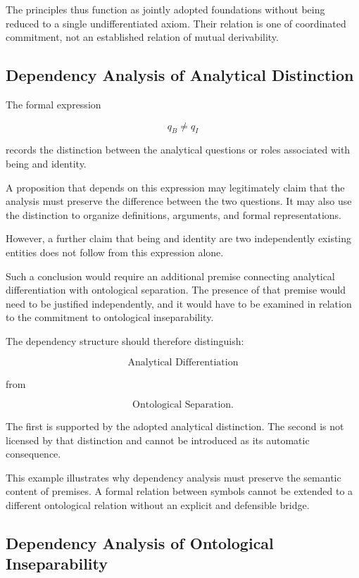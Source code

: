 The principles thus function as jointly adopted foundations
without being reduced to a single undifferentiated axiom.
Their relation is one of coordinated commitment, not an
established relation of mutual derivability.

\subsection{Dependency Analysis of Analytical Distinction}

The formal expression

\[
    q_B \neq q_I
\]

records the distinction between the analytical questions or
roles associated with being and identity.

A proposition that depends on this expression may legitimately
claim that the analysis must preserve the difference between
the two questions. It may also use the distinction to organize
definitions, arguments, and formal representations.

However, a further claim that being and identity are two
independently existing entities does not follow from this
expression alone.

Such a conclusion would require an additional premise connecting
analytical differentiation with ontological separation. The
presence of that premise would need to be justified independently,
and it would have to be examined in relation to the commitment
to ontological inseparability.

The dependency structure should therefore distinguish:

\[
    \text{Analytical Differentiation}
\]

from

\[
    \text{Ontological Separation}.
\]

The first is supported by the adopted analytical distinction.
The second is not licensed by that distinction and cannot be
introduced as its automatic consequence.

This example illustrates why dependency analysis must preserve
the semantic content of premises. A formal relation between
symbols cannot be extended to a different ontological relation
without an explicit and defensible bridge.

\subsection{Dependency Analysis of Ontological Inseparability}

